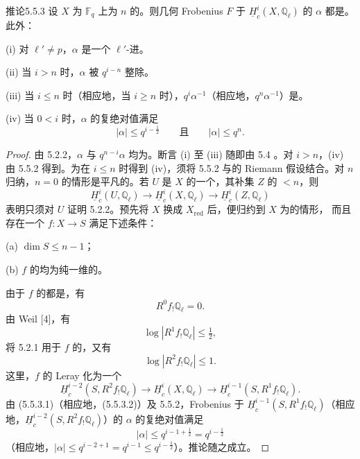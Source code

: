 \begin{SGAresult}{推论}{5.5.3}
设 $X$ 为 $\mathbb F_q$ 上为 $n$ 的。则几何 Frobenius  $F$ 于 $\underline H_c^i(X,\mathbb Q_\ell)$ 的 $\alpha$ 都是。此外：

\textup{(i)} 对 $\ell'\ne p$，$\alpha$ 是一个 $\ell'$-进。

\textup{(ii)} 当 $i>n$ 时，$\alpha$ 被 $q^{i-n}$ 整除。

\textup{(iii)} 当 $i\leq n$ 时（相应地，当 $i\geq n$ 时），$q^i\alpha^{-1}$（相应地，$q^n\alpha^{-1}$）是。

\textup{(iv)} 当 $0<i$ 时，$\alpha$ 的复绝对值满足
\[
|\alpha|\leq q^{i-\frac12}\qquad\text{且}\qquad |\alpha|\leq q^n.
\]
\end{SGAresult}
\begin{proof}
由 5.2.2，$\alpha$ 与 $q^{n-i}\alpha$ 均为。断言 (i) 至 (iii) 随即由 5.4 。对 $i>n$，(iv) 由 5.5.2 得到。为在 $i\leq n$ 时得到 (iv)，须将 5.5.2 与的 Riemann 假设结合。对 $n$ 归纳，$n=0$ 的情形是平凡的。若 $U$ 是 $X$ 的一个，其补集 $Z$ 的 $<n$，则
\[
\underline H_c^i(U,\mathbb Q_\ell)\longrightarrow
\underline H_c^i(X,\mathbb Q_\ell)\longrightarrow
\underline H_c^i(Z,\mathbb Q_\ell)
\]
表明只须对 $U$ 证明 5.2.2。预先将 $X$ 换成 $X_{\mathrm{red}}$ 后，便归约到 $X$ 为的情形，
而且存在一个 $f:X\to S$ 满足下述条件：

\textup{(a)} $\dim S\leq n-1$；

\textup{(b)} $f$ 的均为纯一维的。

由于 $f$ 的都是，有
\[
R^0f_!\mathbb Q_\ell=0.
\]
由 Weil [4]，有
\[
\log|R^1f_!\mathbb Q_\ell|\leq\tfrac12,
\tag{5.5.3.1}
\]
将 5.2.1 用于 $f$ 的，又有
\[
\log|R^2f_!\mathbb Q_\ell|\leq1.
\tag{5.5.3.2}
\]
这里，$f$ 的 Leray 化为一个
\[
\underline H_c^{i-2}(S,R^2f_!\mathbb Q_\ell)\longrightarrow
\underline H_c^i(X,\mathbb Q_\ell)\longrightarrow
\underline H_c^{i-1}(S,R^1f_!\mathbb Q_\ell).
\]
由 (5.5.3.1)（相应地，(5.5.3.2)）及 5.5.2，Frobenius 于 $\underline H_c^{i-1}(S,R^1f_!\mathbb Q_\ell)$（相应地，$\underline H_c^{i-2}(S,R^2f_!\mathbb Q_\ell)$）的 $\alpha$ 的复绝对值满足
\[
|\alpha|\leq q^{i-1+\frac12}=q^{i-\frac12}
\]
（相应地，$|\alpha|\leq q^{i-2+1}=q^{i-1}\leq q^{i-\frac12}$）。推论随之成立。
\end{proof}

